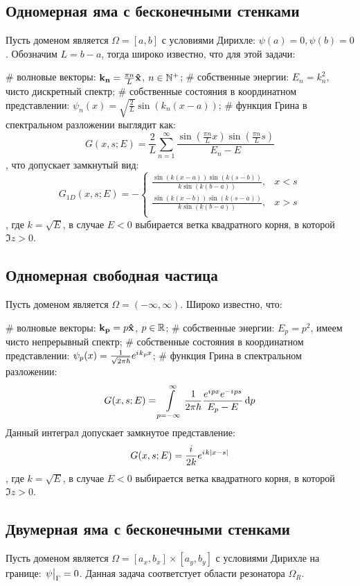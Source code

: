 \subsection{Одномерная яма с бесконечными стенками}
Пусть доменом является $\Omega = [a, b]$ с условиями Дирихле: $\psi(a) = 0, \psi(b) = 0$. Обозначим $L = b - a$, тогда широко известно, что для этой задачи:
\begin{ilist}
# волновые векторы: $\vb{k_n} = \frac{\pi n}{L} \vb{\hat{x}}$, $n \in \mathbb{N}^+$;
# собственные энергии: $E_n = k_n^2$, чисто дискретный спектр;
# собственные состояния в координатном представлении: $\psi_n(x) = \sqrt{\frac{2}{L}} \sin(k_n (x - a))$;
# функция Грина в спектральном разложении выглядит как:
\[
G(x, s; E) = \frac{2}{L} \sum\limits_{n = 1}^\infty \frac{\sin(\frac{\pi n}{L} x) \sin(\frac{\pi n}{L} s)}{E_n - E}
\]
, что допускает замкнутый вид:
\[
G_{1D}(x, s; E) = -\begin{cases}
\frac{\sin(k(x - a)) \sin(k(s - b))}{k \sin(k(b - a))}, & x < s \\
\frac{\sin(k(x - b)) \sin(k(s - a))}{k \sin(k(b - a))}, & x > s \\
\end{cases}
\]
, где $k = \sqrt{E}$, в случае $E < 0$ выбирается ветка квадратного корня, в которой $\Im z > 0$.
\end{ilist}

\subsection{Одномерная свободная частица}
Пусть доменом является $\Omega = (-\infty, \infty)$. Широко известно, что:
\begin{ilist}
# волновые векторы: $\vb{k_{p}} = p \vb{\hat{x}}$, $p \in \mathbb{R}$;
# собственные энергии: $E_p = p^2$, имеем чисто непрерывный спектр;
# собственные состояния в координатном представлении: $\psi_p(x) = \frac{1}{\sqrt{2 \pi \hbar}} e^{{i\mkern1mu} k_p x}$;
# функция Грина в спектральном разложении:
\[
G(x, s; E) = \int\limits_{p = -\infty}^\infty \frac{1}{2 \pi \hbar} \frac{e^{{i\mkern1mu} p x} e^{-{i\mkern1mu} p s}}{E_p - E} \dd{p}
\]
Данный интеграл допускает замкнутое представление:
\[
G(x, s; E) = \frac{{i\mkern1mu}}{2 k} e^{{i\mkern1mu} k |x - s|}
\]
, где $k = \sqrt{E}$, в случае $E < 0$ выбирается ветка квадратного корня, в которой $\Im z > 0$.
\end{ilist}

\subsection{Двумерная яма с бесконечными стенками}
Пусть доменом является $\Omega = [a_x, b_x] \times [a_y, b_y]$ с условиями Дирихле на границе: $\eval{\psi}_{\Gamma} = 0$. Данная задача соответстует области резонатора $\Omega_R$.

